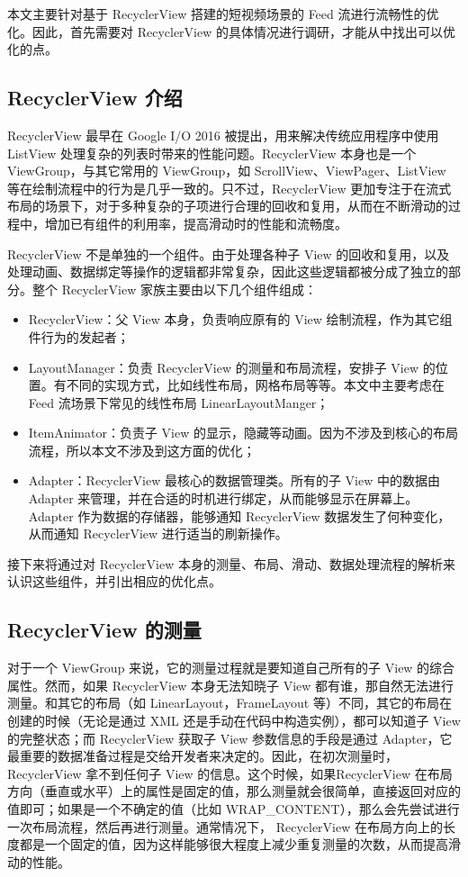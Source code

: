 本文主要针对基于 RecyclerView 搭建的短视频场景的 Feed 流进行流畅性的优化。因此，首先需要对 RecyclerView 的具体情况进行调研，才能从中找出可以优化的点。

\subsection{RecyclerView 介绍}

RecyclerView 最早在 Google I/O 2016 被提出，用来解决传统应用程序中使用 ListView 处理复杂的列表时带来的性能问题。RecyclerView 本身也是一个 ViewGroup，与其它常用的 ViewGroup，如 ScrollView、ViewPager、ListView 等在绘制流程中的行为是几乎一致的\cite{mawlood2022listview}。只不过，RecyclerView 更加专注于在流式布局的场景下，对于多种复杂的子项进行合理的回收和复用，从而在不断滑动的过程中，增加已有组件的利用率，提高滑动时的性能和流畅度。

RecyclerView 不是单独的一个组件。由于处理各种子 View 的回收和复用，以及处理动画、数据绑定等操作的逻辑都非常复杂，因此这些逻辑都被分成了独立的部分。整个 RecyclerView 家族主要由以下几个组件组成：

\begin{itemize}
    \item RecyclerView：父 View 本身，负责响应原有的 View 绘制流程，作为其它组件行为的发起者；
    \item LayoutManager：负责 RecyclerView 的测量和布局流程，安排子 View 的位置。有不同的实现方式，比如线性布局，网格布局等等。本文中主要考虑在 Feed 流场景下常见的线性布局 LinearLayoutManger；
    \item ItemAnimator：负责子 View 的显示，隐藏等动画。因为不涉及到核心的布局流程，所以本文不涉及到这方面的优化；
    \item Adapter：RecyclerView 最核心的数据管理类。所有的子 View 中的数据由 Adapter 来管理，并在合适的时机进行绑定，从而能够显示在屏幕上。Adapter 作为数据的存储器，能够通知 RecyclerView 数据发生了何种变化，从而通知 RecyclerView 进行适当的刷新操作。
\end{itemize}

接下来将通过对 RecyclerView 本身的测量、布局、滑动、数据处理流程的解析来认识这些组件，并引出相应的优化点。

\subsection{RecyclerView 的测量}

对于一个 ViewGroup 来说，它的测量过程就是要知道自己所有的子 View 的综合属性。然而，如果 RecyclerView 本身无法知晓子 View 都有谁，那自然无法进行测量。和其它的布局（如 LinearLayout，FrameLayout 等）不同，其它的布局在创建的时候（无论是通过 XML 还是手动在代码中构造实例），都可以知道子 View 的完整状态；而 RecyclerView 获取子 View 参数信息的手段是通过 Adapter，它最重要的数据准备过程是交给开发者来决定的。因此，在初次测量时，RecyclerView 拿不到任何子 View 的信息。这个时候，如果RecyclerView 在布局方向（垂直或水平）上的属性是固定的值，那么测量就会很简单，直接返回对应的值即可；如果是一个不确定的值（比如 WRAP\_CONTENT），那么会先尝试进行一次布局流程，然后再进行测量。通常情况下， RecyclerView 在布局方向上的长度都是一个固定的值，因为这样能够很大程度上减少重复测量的次数，从而提高滑动的性能。

